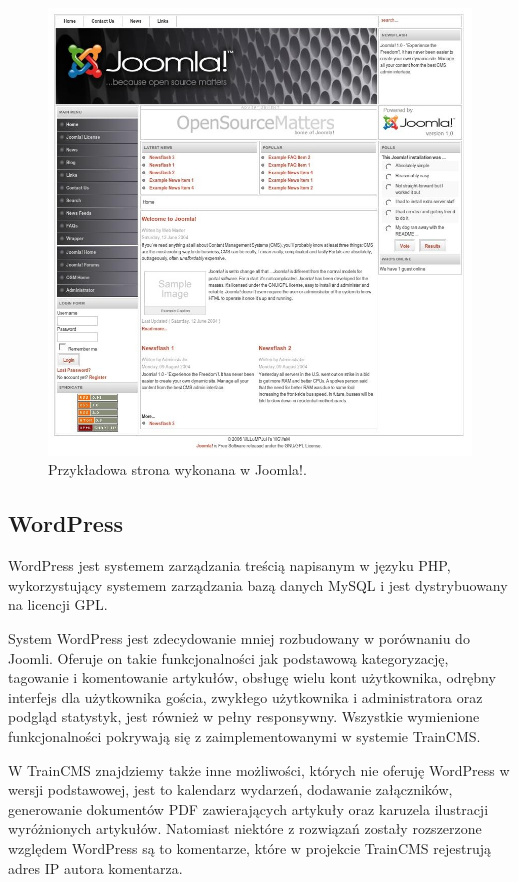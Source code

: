 \documentclass[openright]{xmgr}
\begin{document}
\begin{figure}[!tbh]
\centering
\includegraphics[width=\linewidth]{fig/joomla}
\caption{Przykładowa strona wykonana w Joomla!.}
\end{figure}

\newpage

\subsection{WordPress}

WordPress jest systemem zarządzania treścią napisanym w języku PHP, wykorzystujący systemem zarządzania bazą danych MySQL i jest dystrybuowany na licencji GPL.

System WordPress jest zdecydowanie mniej rozbudowany w porównaniu do Joomli. Oferuje on takie funkcjonalności jak podstawową kategoryzację, tagowanie i komentowanie artykułów, obsługę wielu kont użytkownika, odrębny interfejs dla użytkownika gościa, zwykłego użytkownika i administratora oraz podgląd statystyk, jest również w pełny responsywny. Wszystkie wymienione funkcjonalności pokrywają się z zaimplementowanymi w systemie TrainCMS.

W TrainCMS znajdziemy także inne możliwości, których nie oferuję WordPress w wersji podstawowej, jest to kalendarz wydarzeń, dodawanie załączników, generowanie dokumentów PDF zawierających artykuły oraz karuzela ilustracji wyróżnionych artykułów. Natomiast niektóre z rozwiązań zostały rozszerzone względem WordPress są to komentarze, które w projekcie TrainCMS rejestrują adres IP autora komentarza.
\end{document}
